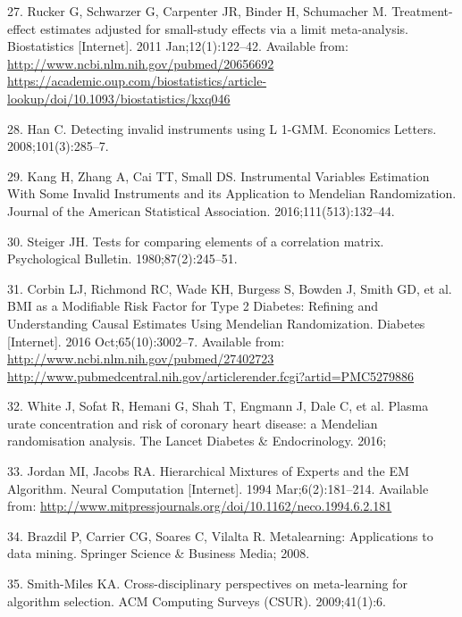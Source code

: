 \documentclass[]{article}
\begin{document}
\hypertarget{ref-Rucker2011}{}
27. Rucker G, Schwarzer G, Carpenter JR, Binder H, Schumacher M.
Treatment-effect estimates adjusted for small-study effects via a limit
meta-analysis. Biostatistics {[}Internet{]}. 2011 Jan;12(1):122--42.
Available from:
\href{http://www.ncbi.nlm.nih.gov/pubmed/20656692\%20https://academic.oup.com/biostatistics/article-lookup/doi/10.1093/biostatistics/kxq046}{http://www.ncbi.nlm.nih.gov/pubmed/20656692 https://academic.oup.com/biostatistics/article-lookup/doi/10.1093/biostatistics/kxq046}

\hypertarget{ref-Han2008}{}
28. Han C. Detecting invalid instruments using L 1-GMM. Economics
Letters. 2008;101(3):285--7.

\hypertarget{ref-Kang2016}{}
29. Kang H, Zhang A, Cai TT, Small DS. Instrumental Variables Estimation
With Some Invalid Instruments and its Application to Mendelian
Randomization. Journal of the American Statistical Association.
2016;111(513):132--44.

\hypertarget{ref-Steiger1980}{}
30. Steiger JH. Tests for comparing elements of a correlation matrix.
Psychological Bulletin. 1980;87(2):245--51.

\hypertarget{ref-Corbin2016}{}
31. Corbin LJ, Richmond RC, Wade KH, Burgess S, Bowden J, Smith GD, et
al. BMI as a Modifiable Risk Factor for Type 2 Diabetes: Refining and
Understanding Causal Estimates Using Mendelian Randomization. Diabetes
{[}Internet{]}. 2016 Oct;65(10):3002--7. Available from:
\href{http://www.ncbi.nlm.nih.gov/pubmed/27402723\%20http://www.pubmedcentral.nih.gov/articlerender.fcgi?artid=PMC5279886}{http://www.ncbi.nlm.nih.gov/pubmed/27402723 http://www.pubmedcentral.nih.gov/articlerender.fcgi?artid=PMC5279886}

\hypertarget{ref-white2016plasma}{}
32. White J, Sofat R, Hemani G, Shah T, Engmann J, Dale C, et al. Plasma
urate concentration and risk of coronary heart disease: a Mendelian
randomisation analysis. The Lancet Diabetes \& Endocrinology. 2016;

\hypertarget{ref-Jordan1994}{}
33. Jordan MI, Jacobs RA. Hierarchical Mixtures of Experts and the EM
Algorithm. Neural Computation {[}Internet{]}. 1994 Mar;6(2):181--214.
Available from:
\url{http://www.mitpressjournals.org/doi/10.1162/neco.1994.6.2.181}

\hypertarget{ref-brazdil2008metalearning}{}
34. Brazdil P, Carrier CG, Soares C, Vilalta R. Metalearning:
Applications to data mining. Springer Science \& Business Media; 2008.

\hypertarget{ref-smith2009cross}{}
35. Smith-Miles KA. Cross-disciplinary perspectives on meta-learning for
algorithm selection. ACM Computing Surveys (CSUR). 2009;41(1):6.
\end{document}
